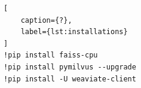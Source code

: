 \begin{lstlisting}[
    caption={?},
    label={lst:installations}
]
!pip install faiss-cpu
!pip install pymilvus --upgrade
!pip install -U weaviate-client
\end{lstlisting}